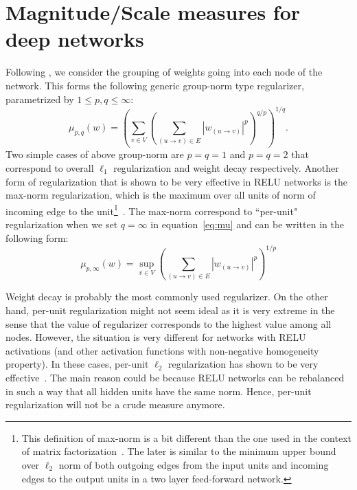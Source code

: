 \documentclass[11pt]{article}
\begin{document}
\section{Magnitude/Scale measures for deep networks}
Following \cite{neyshabur15}, we consider the grouping of weights going into each node of the
network. This forms the following generic group-norm type regularizer, parametrized by $1\leq p,q \leq\infty$:
\begin{equation}
  \label{eq:mu}
  \mu_{p,q}(w) = \left(\sum_{v \in V}\left(\sum_{(u\rightarrow v) \in E} \left\lvert w_{(u\rightarrow v)}\right\rvert ^p\right)^{q/p}\right)^{1/q}.
\end{equation}
Two simple cases of above group-norm are $p=q=1$ and $p=q=2$ that
correspond to overall $\ell_1$ regularization and weight decay
respectively. Another form of regularization that is shown to be very
effective in RELU networks is the max-norm regularization, which is the
maximum over all units of norm of incoming edge to the
unit\footnote{This definition of max-norm is a bit different than the
  one used in the context of matrix factorization~\cite{srebro05}. The
  later is similar to the minimum upper bound over $\ell_2$ norm of
  both outgoing edges from the input units and incoming edges to the
  output units in a two layer feed-forward
  network.}~\cite{goodfellow13,srivastava14}. The max-norm correspond
to ``per-unit" regularization when we set $q=\infty$ in
equation~\eqref{eq:mu} and can be written in the following form:
\begin{equation}
  \label{eq:mu}
  \mu_{p,\infty}(w) =\sup_{v \in V}\left(\sum_{(u\rightarrow v) \in E} \left\lvert w_{(u\rightarrow v)}\right\rvert ^p\right)^{1/p}
\end{equation}

Weight decay is probably the most commonly used regularizer. On the
other hand, per-unit regularization might not seem ideal as it is
very extreme in the sense that the value of regularizer corresponds to
the highest value among all nodes.  However, the situation is very
different for networks with RELU activations (and other activation
functions with non-negative homogeneity property).  In these cases,
per-unit $\ell_2$ regularization has shown to be very
effective~\cite{srivastava14}. The main reason could be because RELU
networks can be rebalanced in such a way that all hidden units have
the same norm. Hence, per-unit regularization will not be a crude
measure anymore.
\end{document}
